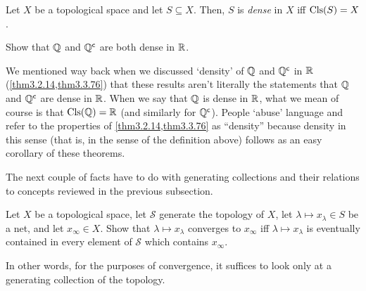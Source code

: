 \begin{dfn}[Dense]\label{Dense}
Let $X$ be a topological space and let $S\subseteq X$.  Then, $S$ is \emph{dense} in $X$ iff $\operatorname{Cls} (S)=X$.
\end{dfn}
\begin{exr}\label{exr4.2.38}
Show that $\mathbb{Q}$ and $\mathbb{Q} ^{\mathsf{c}}$ are both dense in $\mathbb{R}$.
\begin{rmk}
We mentioned way back when we discussed `density' of $\mathbb{Q}$ and $\mathbb{Q} ^{\mathsf{c}}$ in $\mathbb{R}$ (\cref{thm3.2.14,thm3.3.76}) that these results aren't literally the statements that $\mathbb{Q}$ and $\mathbb{Q} ^{\mathsf{c}}$ are dense in $\mathbb{R}$.  When we say that $\mathbb{Q}$ is dense in $\mathbb{R}$, what we mean of course is that $\operatorname{Cls} (\mathbb{Q} )=\mathbb{R}$ (and similarly for $\mathbb{Q} ^{\mathsf{c}}$).  People `abuse' language and refer to the properties of \cref{thm3.2.14,thm3.3.76} as ``density'' because density in this sense (that is, in the sense of the definition above) follows as an easy corollary of these theorems.
\end{rmk}
\end{exr}

The next couple of facts have to do with generating collections and their relations to concepts reviewed in the previous subsection.
\begin{exr}\label{exr4.2.41}
Let $X$ be a topological space, let $\mathcal{S}$ generate the topology of $X$, let $\lambda \mapsto x_\lambda \in S$ be a net, and let $x_\infty \in X$.  Show that $\lambda \mapsto x_\lambda$ converges to $x_\infty$ iff $\lambda \mapsto x_\lambda$ is eventually contained in every element of $\mathcal{S}$ which contains $x_\infty$.
\begin{rmk}
In other words, for the purposes of convergence, it suffices to look only at a generating collection of the topology.
\end{rmk}
\end{exr}

